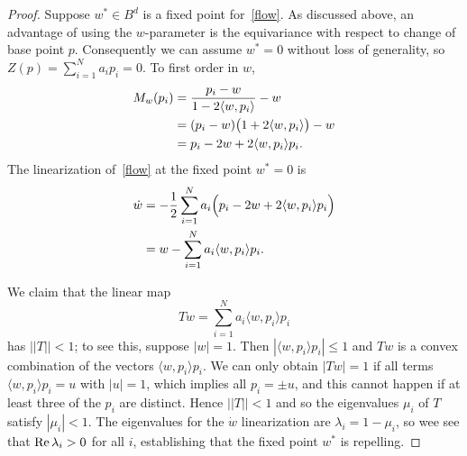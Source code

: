 \documentclass[%
 aip,
 amsmath,amssymb,
 reprint,%
]{revtex4-1}
\begin{document}
\begin{proof}
Suppose $w^\ast \in B^d$ is a fixed point for~\eqref{flow}.  As discussed above, an advantage of using the $w$-parameter is the equivariance with respect to change of base point $p$.  Consequently we can assume $w^\ast = 0$ without loss of generality, so $Z(p) =\sum\limits_{i = 1}^N a_i p_i =  0$.  To first order in $w$,
\begin{align*}
M_w(p_i ) &= { p_i - w \over 1 - 2 \langle w, p_i \rangle } - w \\&= (p_i - w) \bigl (1 + 2  \langle w, p_i \rangle \bigr ) -w \\&= p_i - 2w + 2  \langle w, p_i \rangle p_i.
\end{align*}
The linearization of~\eqref{flow} at the fixed point $w^\ast = 0$ is
\begin{align*}
\dot w &= -{1 \over 2} \sum_{i = 1}^N a_i \Bigl ( p_i - 2w + 2 \langle w, p_i \rangle p_i \Bigr )
\\&= w - \sum_{i = 1}^N a_i   \langle w, p_i \rangle p_i.
\end{align*}

We claim that the linear map
$$
Tw = \sum_{i = 1}^N a_i   \langle w, p_i \rangle p_i
$$
has $||T || <1$; to see this, suppose $|w| = 1$.  Then  $|  \langle w, p_i \rangle p_i | \le 1$ and $Tw$ is a convex combination of the vectors $\langle w, p_i \rangle p_i$.  We can only obtain $| Tw | = 1$  if all terms $\langle w, p_i \rangle p_i = u$ with $| u | = 1$, which implies all $p_i = \pm u$, and this cannot happen if at least three of the $p_i$ are distinct.
Hence $||T|| < 1$ and so the eigenvalues $\mu_i$ of $T$ satisfy $|\mu_i| < 1$.  The eigenvalues for the $\dot w$ linearization are $\lambda_i = 1 - \mu_i$, so wee see that ${\rm Re} \, \lambda_i > 0$ for all $i$, establishing that the fixed point $w^\ast$ is repelling.
\end{proof}
\end{document}
